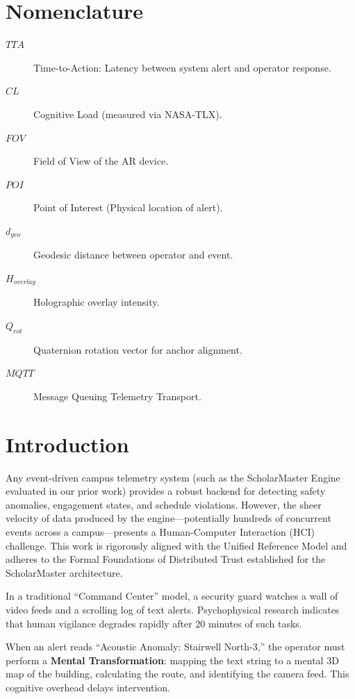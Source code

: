\documentclass[conference]{IEEEtran}
\begin{document}
\section*{Nomenclature}
\begin{description}
    \item[$TTA$] Time-to-Action: Latency between system alert and operator response.
    \item[$CL$] Cognitive Load (measured via NASA-TLX).
    \item[$FOV$] Field of View of the AR device.
    \item[$POI$] Point of Interest (Physical location of alert).
    \item[$d_{geo}$] Geodesic distance between operator and event.
    \item[$H_{overlay}$] Holographic overlay intensity.
    \item[$Q_{rot}$] Quaternion rotation vector for anchor alignment.
    \item[$MQTT$] Message Queuing Telemetry Transport.
\end{description}

\section{Introduction}
Any event-driven campus telemetry system (such as the ScholarMaster Engine evaluated in our prior work) provides a robust backend for detecting safety anomalies, engagement states, and schedule violations. However, the sheer velocity of data produced by the engine---potentially hundreds of concurrent events across a campus---presents a Human-Computer Interaction (HCI) challenge.  This work is rigorously aligned with the Unified Reference Model \cite{P20} and adheres to the Formal Foundations of Distributed Trust \cite{P21} established for the ScholarMaster architecture.

In a traditional ``Command Center'' model, a security guard watches a wall of video feeds and a scrolling log of text alerts. Psychophysical research indicates that human vigilance degrades rapidly after 20 minutes of such tasks. 

When an alert reads ``Acoustic Anomaly: Stairwell North-3,'' the operator must perform a \textbf{Mental Transformation}: mapping the text string to a mental 3D map of the building, calculating the route, and identifying the camera feed. This cognitive overhead delays intervention.
\end{document}
